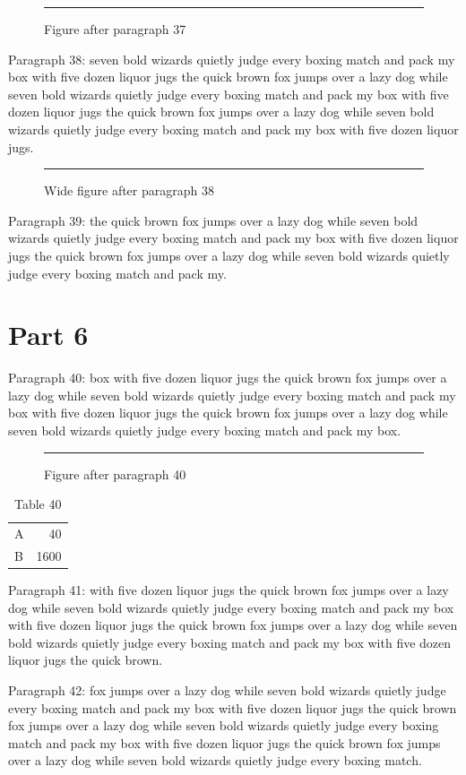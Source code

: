 \documentclass[twocolumn]{article}
\begin{document}
\begin{figure}[tbp]\centering\rule{0.8\columnwidth}{8em}\caption{Figure after paragraph 37}\end{figure}
Paragraph 38: seven bold wizards quietly judge every boxing match and pack my box with five dozen liquor jugs the quick brown fox jumps over a lazy dog while seven bold wizards quietly judge every boxing match and pack my box with five dozen liquor jugs the quick brown fox jumps over a lazy dog while seven bold wizards quietly judge every boxing match and pack my box with five dozen liquor jugs.

\begin{figure}[t]\centering\rule{0.7\textwidth}{8em}\caption{Wide figure after paragraph 38}\end{figure}
Paragraph 39: the quick brown fox jumps over a lazy dog while seven bold wizards quietly judge every boxing match and pack my box with five dozen liquor jugs the quick brown fox jumps over a lazy dog while seven bold wizards quietly judge every boxing match and pack my.

\section{Part 6}
Paragraph 40: box with five dozen liquor jugs the quick brown fox jumps over a lazy dog while seven bold wizards quietly judge every boxing match and pack my box with five dozen liquor jugs the quick brown fox jumps over a lazy dog while seven bold wizards quietly judge every boxing match and pack my box.

\begin{figure}[htbp]\centering\rule{0.8\columnwidth}{5em}\caption{Figure after paragraph 40}\end{figure}
\begin{table}[htb]\centering\begin{tabular}{lr}A & 40\\ B & 1600\end{tabular}\caption{Table 40}\end{table}
Paragraph 41: with five dozen liquor jugs the quick brown fox jumps over a lazy dog while seven bold wizards quietly judge every boxing match and pack my box with five dozen liquor jugs the quick brown fox jumps over a lazy dog while seven bold wizards quietly judge every boxing match and pack my box with five dozen liquor jugs the quick brown.

Paragraph 42: fox jumps over a lazy dog while seven bold wizards quietly judge every boxing match and pack my box with five dozen liquor jugs the quick brown fox jumps over a lazy dog while seven bold wizards quietly judge every boxing match and pack my box with five dozen liquor jugs the quick brown fox jumps over a lazy dog while seven bold wizards quietly judge every boxing match.
\end{document}
